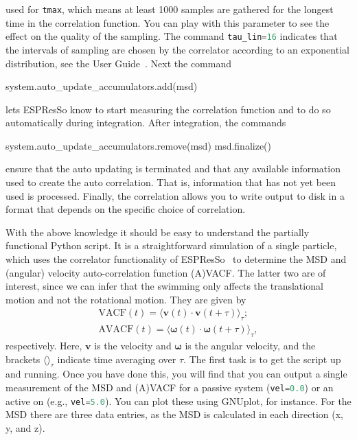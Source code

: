 \documentclass[aip,jcp,reprint,a4paper,onecolumn,amsmath]{revtex4-1}
\newcommand{\es}{\mbox{\textsf{ESPResSo}}\xspace}
\newcommand\codees{\lstinline[language=python]}
\begin{document}
used for \codees{tmax}, which means at least 1000 samples are gathered for the
longest time in the correlation function. You can play with this parameter to
see the effect on the quality of the sampling. The command \codees{tau_lin=16}
indicates that the intervals of sampling are chosen by the correlator according
to an exponential distribution, see the User Guide~\cite{UG}. Next the command
\begin{espresso}
system.auto_update_accumulators.add(msd)
\end{espresso}
lets \es{} know to start measuring the correlation function and to do so
automatically during integration. After integration, the commands
\begin{espresso}
system.auto_update_accumulators.remove(msd)
msd.finalize()
\end{espresso}
ensure that the auto updating is terminated and that any available information
used to create the auto correlation. That is, information that has not yet been
used is processed. Finally, the correlation allows you to write output to disk
in a format that depends on the specific choice of correlation.

With the above knowledge it should be easy to understand the partially
functional Python script. It is a straightforward simulation of a single
particle, which uses the correlator functionality of \es{}~\cite{Arnold_13,UG}
to determine the MSD and (angular) velocity auto-correlation function (A)VACF.
The latter two are of interest, since we can infer that the swimming only
affects the translational motion and not the rotational motion. They are given
by
\begin{eqnarray}
\label{eq:vacf} \mathrm{VACF}(t) = \langle \mathbf{v}(t) \cdot \mathbf{v}(t + \tau) \rangle_{\tau}; \\
\label{eq:avacf} \mathrm{AVACF}(t) = \langle \boldsymbol{\omega}(t) \cdot \boldsymbol{\omega}(t + \tau) \rangle_{\tau} ,
\end{eqnarray}
respectively. Here, $\mathbf{v}$ is the velocity and $\boldsymbol{\omega}$ is
the angular velocity, and the brackets $\langle \rangle_{\tau}$ indicate time
averaging over $\tau$. The first task is to get the script up and running. Once
you have done this, you will find that you can output a single measurement of
the MSD and (A)VACF for a passive system (\codees{vel=0.0}) or an active on
(e.g., \codees{vel=5.0}). You can plot these using GNUplot, for instance. For
the MSD there are three data entries, as the MSD is calculated in each
direction (x, y, and z).
\end{document}
